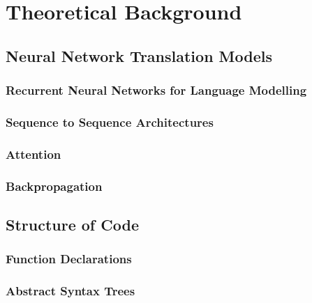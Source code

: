 \chapter{Theoretical Background}
\label{theoreticalbackground}




\section{Neural Network Translation Models} %
\label{sec:lstm}

\subsection{Recurrent Neural Networks for Language Modelling} %
\label{sub:recurrent_neural_networks}

\subsection{Sequence to Sequence Architectures} %
\label{sub:sequence_to_sequence_architectures}

\subsection{Attention} %
\label{sub:attention}

\subsection{Backpropagation} %
\label{sub:backpropagation}

\blindtext

\section{Structure of Code} %
\label{sec:translating_code}

\subsection{Function Declarations} %
\label{sub:function_declarations}

\subsection{Abstract Syntax Trees} %
\label{sub:abstract_syntax_trees}



\blindtext
